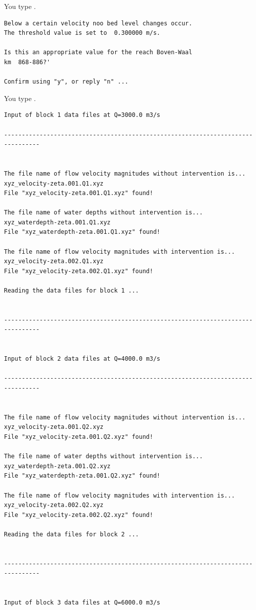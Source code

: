 You type .

\begin{Verbatim}
Below a certain velocity noo bed level changes occur.
The threshold value is set to  0.300000 m/s.

Is this an appropriate value for the reach Boven-Waal                   km  868-886?'

Confirm using "y", or reply "n" ...
\end{Verbatim}

You type .

\begin{Verbatim}
Input of block 1 data files at Q=3000.0 m3/s

--------------------------------------------------------------------------------


The file name of flow velocity magnitudes without intervention is...
xyz_velocity-zeta.001.Q1.xyz
File "xyz_velocity-zeta.001.Q1.xyz" found!

The file name of water depths without intervention is...
xyz_waterdepth-zeta.001.Q1.xyz
File "xyz_waterdepth-zeta.001.Q1.xyz" found!

The file name of flow velocity magnitudes with intervention is...
xyz_velocity-zeta.002.Q1.xyz
File "xyz_velocity-zeta.002.Q1.xyz" found!

Reading the data files for block 1 ...


--------------------------------------------------------------------------------


Input of block 2 data files at Q=4000.0 m3/s

--------------------------------------------------------------------------------


The file name of flow velocity magnitudes without intervention is...
xyz_velocity-zeta.001.Q2.xyz
File "xyz_velocity-zeta.001.Q2.xyz" found!

The file name of water depths without intervention is...
xyz_waterdepth-zeta.001.Q2.xyz
File "xyz_waterdepth-zeta.001.Q2.xyz" found!

The file name of flow velocity magnitudes with intervention is...
xyz_velocity-zeta.002.Q2.xyz
File "xyz_velocity-zeta.002.Q2.xyz" found!

Reading the data files for block 2 ...


--------------------------------------------------------------------------------


Input of block 3 data files at Q=6000.0 m3/s


\end{Verbatim}
